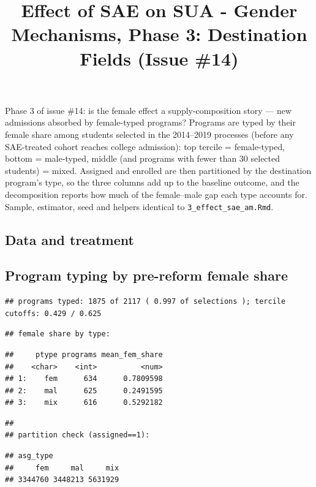 \documentclass[
]{article}
\title{Effect of SAE on SUA - Gender Mechanisms, Phase 3: Destination
Fields (Issue \#14)}
\author{}
\date{\vspace{-2.5em}}
\begin{document}
\maketitle

Phase 3 of issue \#14: is the female effect a supply-composition story
--- new admissions absorbed by female-typed programs? Programs are typed
by their female share among students selected in the 2014--2019
processes (before any SAE-treated cohort reaches college admission): top
tercile = female-typed, bottom = male-typed, middle (and programs with
fewer than 30 selected students) = mixed. Assigned and enrolled are then
partitioned by the destination program's type, so the three columns add
up to the baseline outcome, and the decomposition reports how much of
the female--male gap each type accounts for. Sample, estimator, seed and
helpers identical to \texttt{3\_effect\_sae\_am.Rmd}.

\hypertarget{data-and-treatment}{%
\subsection{Data and treatment}\label{data-and-treatment}}

\hypertarget{program-typing-by-pre-reform-female-share}{%
\subsection{Program typing by pre-reform female
share}\label{program-typing-by-pre-reform-female-share}}

\begin{verbatim}
## programs typed: 1875 of 2117 ( 0.997 of selections ); tercile cutoffs: 0.429 / 0.625
\end{verbatim}

\begin{verbatim}
## female share by type:
\end{verbatim}

\begin{verbatim}
##     ptype programs mean_fem_share
##    <char>    <int>          <num>
## 1:    fem      634      0.7809598
## 2:    mal      625      0.2491595
## 3:    mix      616      0.5292182
\end{verbatim}

\begin{verbatim}
## 
## partition check (assigned==1):
\end{verbatim}

\begin{verbatim}
## asg_type
##     fem     mal     mix 
## 3344760 3448213 5631929
\end{verbatim}
\end{document}
